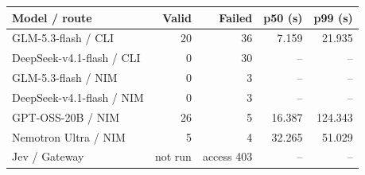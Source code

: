 \begin{tabular}{lrrrr}
\toprule
Model / route & Valid & Failed & p50 (s) & p99 (s) \\
\midrule
GLM-5.3-flash / CLI & 20 & 36 & 7.159 & 21.935 \\
DeepSeek-v4.1-flash / CLI & 0 & 30 & -- & -- \\
GLM-5.3-flash / NIM & 0 & 3 & -- & -- \\
DeepSeek-v4.1-flash / NIM & 0 & 3 & -- & -- \\
GPT-OSS-20B / NIM & 26 & 5 & 16.387 & 124.343 \\
Nemotron Ultra / NIM & 5 & 4 & 32.265 & 51.029 \\
Jev / Gateway & not run & access 403 & -- & -- \\
\bottomrule
\end{tabular}
